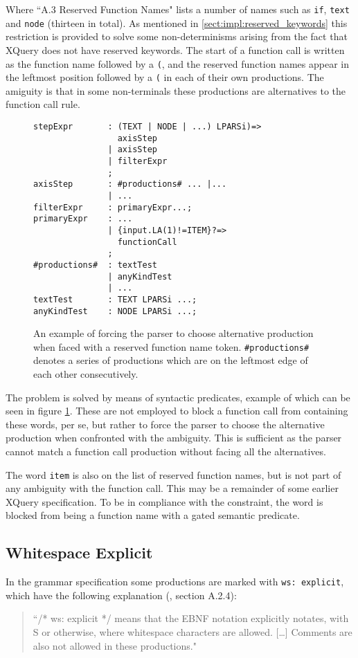Where ``A.3 Reserved Function Names" lists a number of names such as \verb!if!, \verb!text! and \verb!node! (thirteen in total). As mentioned in \ref{sect:impl:reserved_keywords} this restriction is provided to solve some non-determinisms arising from the fact that XQuery does not have reserved keywords. The start of a function call is written as the function name followed by a \verb!(!, and the reserved function names appear in the leftmost position followed by a \verb!(! in each of their own productions. The amiguity is that in some non-terminals these productions are alternatives to the function call rule.

\begin{figure}[h!]
\begin{Verbatim}
stepExpr       : (TEXT | NODE | ...) LPARSi)=> 
                 axisStep
               | axisStep
               | filterExpr
               ;
axisStep       : #productions# ... |...
               | ...
filterExpr     : primaryExpr...;
primaryExpr    : ...
               | {input.LA(1)!=ITEM}?=>
                 functionCall
               ;
#productions#  : textTest
               | anyKindTest
               | ...
textTest       : TEXT LPARSi ...;
anyKindTest    : NODE LPARSi ...;
\end{Verbatim}
\caption[Reserved function names diverted by syntactic predicates]{An example of forcing the parser to choose alternative production when faced with a reserved function name token. \texttt{\#productions\#} denotes a series of productions which are on the leftmost edge of each other consecutively.}
\label{fig:reservedFunction}
\end{figure}

The problem is solved by means of syntactic predicates, example of which can be seen in figure \ref{fig:reservedFunction}. These are not employed to block a function call from containing these words, per se, but rather to force the parser to choose the alternative production when confronted with the ambiguity. This is sufficient as the parser cannot match a function call production without facing all the alternatives.

The word \verb!item! is also on the list of reserved function names, but is
not part of any ambiguity with the function call. This may be a
remainder of some earlier XQuery specification. To be in compliance with the constraint, the word is blocked from being a function name  with a gated semantic predicate.

\subsection{Whitespace Explicit}
\label{sect:implementation:whitespace}
In the grammar specification some productions are marked with \verb!ws: explicit!, which have the following explanation (\cite{w3c00}, section A.2.4):
\begin{quote}
``/* ws: explicit */ means that the EBNF notation explicitly notates, with S or otherwise, where whitespace characters are allowed. [\ldots] Comments are also not allowed in these productions."
\end{quote} 

